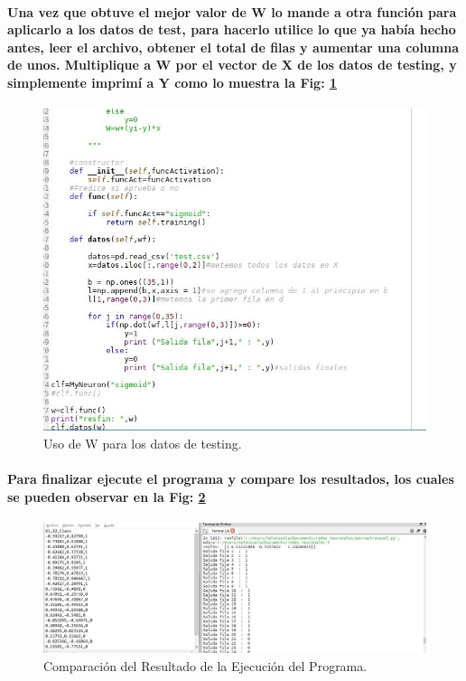 \documentclass[10pt,a4paper]{article}
\begin{document}
\paragraph{Una vez que obtuve el mejor valor de W lo mande a otra funci\'on para aplicarlo a los datos de test, para hacerlo utilice lo que ya hab\'ia hecho antes, leer el archivo, obtener el total de filas y aumentar una columna de unos. Multiplique a W por el vector de X de los datos de testing, y simplemente imprim\'i a Y como lo muestra la Fig: \ref{fig:testing}}
\begin{figure}[h]
\includegraphics[scale=0.4] {cod2.jpg}
\caption{Uso de W para los datos de testing.}
\label{fig:testing}
\end{figure}

\paragraph{Para finalizar ejecute el programa y compare los resultados, los cuales se pueden observar en la Fig: \ref{fig:Res} }

\begin{figure}[h]
\includegraphics[scale=0.4] {res.jpg}
\caption{Comparaci\'on del Resultado de la Ejecuci\'on del Programa.}
\label{fig:Res}
\end{figure}
\end{document}
